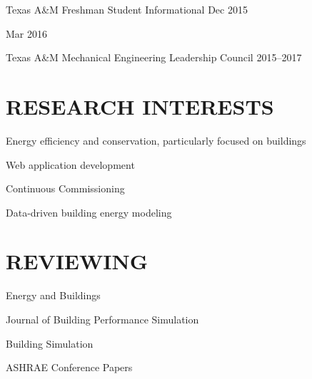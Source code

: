 \documentclass[margin]{res} %
\begin{document}
\begin{resume}
Texas A\&M Freshman Student Informational \hfill Dec 2015\\
\strut \hfill Mar 2016

Texas A\&M Mechanical Engineering Leadership Council \hfill 2015--2017


\section{RESEARCH INTERESTS}

Energy efficiency and conservation, particularly focused on buildings

Web application development

Continuous Commissioning\textsuperscript{\textregistered{}}

Data-driven building energy modeling

\section{REVIEWING}

Energy and Buildings


Journal of Building Performance Simulation

Building Simulation

ASHRAE Conference Papers

\end{resume}

\end{document}
